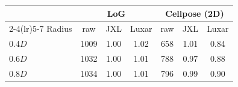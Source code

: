 \begin{tabular}{lcccccc}
\toprule
 & \multicolumn{3}{c}{LoG} & \multicolumn{3}{c}{Cellpose (2D)} \\
\cmidrule(lr){2-4}\cmidrule(lr){5-7}
Radius & raw & JXL & Luxar & raw & JXL & Luxar \\
\midrule
0.4$D$ & 1009 & 1.00 & 1.02 & 658 & 1.01 & 0.84 \\
0.6$D$ & 1032 & 1.00 & 1.01 & 788 & 0.97 & 0.88 \\
0.8$D$ & 1034 & 1.00 & 1.01 & 796 & 0.99 & 0.90 \\
\bottomrule
\end{tabular}
